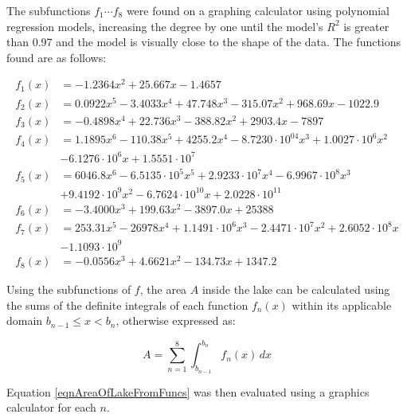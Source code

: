 \documentclass[a4paper]{article}
\theoremstyle{definition}
\begin{document}
        The subfunctions $f_1 \cdots f_8$ were found on a graphing calculator using polynomial regression models, increasing the degree by one until the model's $R^2$ is greater than 0.97 and the model is visually close to the shape of the data. The functions found are as follows:

        \begin{align*} %
            f_1(x) &= -1.2364x^2 + 25.667x - 1.4657 \\
            f_2(x) &= 0.0922x^5 - 3.4033x^4 + 47.748x^3 - 315.07x^2 + 968.69x - 1022.9 \\
            f_3(x) &= -0.4898x^4 + 22.736x^3 - 388.82x^2 + 2903.4x - 7897 \\
            f_4(x) &= 1.1895x^6 - 110.38x^5 + 4255.2x^4 - 8.7230\cdot 10^04x^3 + 1.0027\cdot 10^6x^2 \\ &- 6.1276\cdot 10^6x + 1.5551\cdot 10^7 \\
            f_5(x) &= 6046.8x^6 - 6.5135 \cdot 10^5x^5 + 2.9233 \cdot 10^7x^4 - 6.9967 \cdot 10^8x^3 \\ &+ 9.4192 \cdot 10^9x^2 - 6.7624 \cdot 10^{10}x + 2.0228 \cdot 10^{11} \\
            f_6(x) &= -3.4000x^3 + 199.63x^2 - 3897.0x + 25388 \\
            f_7(x) &= 253.31x^5 - 26978x^4 + 1.1491 \cdot 10^6x^3 - 2.4471 \cdot 10^7x^2 + 2.6052 \cdot 10^8x \\ &- 1.1093 \cdot 10^9 \\
            f_8(x) &= -0.0556x^3 + 4.6621x^2 - 134.73x + 1347.2
        \end{align*}

        Using the subfunctions of $f$, the area $A$ inside the lake can be calculated using the sums of the definite integrals of each function $f_n(x)$ within its applicable domain $b_{n-1} \leq x < b_n$, otherwise expressed as:

        \begin{equation}\label{eqnAreaOfLakeFromFuncs}
           A = \sum_{n=1}^8 \int_{b_{n-1}}^{b_n} f_n(x)\,dx
        \end{equation}
        
        Equation \ref{eqnAreaOfLakeFromFuncs} was then evaluated using a graphics calculator for each $n$.
\end{document}
